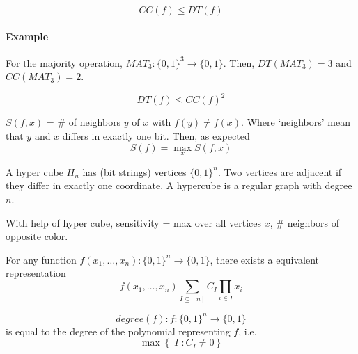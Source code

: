 \begin{proposition}
	\begin{equation}
		CC(f) \leq DT(f)
	\end{equation}
\end{proposition}

\paragraph{Example} For the majority operation, $MAT_3: \{ 0, 1\} ^3 \rightarrow \{ 0 , 1 \}$. Then, $DT(MAT_3) = 3$ and $CC(MAT_3) = 2$. 

\begin{proposition} 
	\begin{equation}
		DT(f) \leq CC(f) ^ 2
	\end{equation}	
\end{proposition}

\begin{definition}
	[Sensitivity] 
	$S(f, x)$ = \# of neighbors $y$ of $x$ with $f(y) \neq f(x)$. Where `neighbors' mean that $y$ and $x$ differs in exactly one bit. Then, as expected
	\begin{equation}
		S(f) = \max_x S(f, x)
	\end{equation}
\end{definition}

\begin{definition}
	A hyper cube $H_n$ has (bit strings) vertices $\{ 0, 1 \} ^ n$. Two vertices are adjacent if they differ in exactly one coordinate. A hypercube is a regular graph with degree $n$. 
\end{definition}

\begin{definition}
	With help of hyper cube, sensitivity = max over all vertices $x$, \# neighbors of opposite color. 
\end{definition}

\begin{proposition} 
	\label{prop: function as polynomial}
	For any function $f(x_1, \dots, x_n): \{ 0, 1\}^n \rightarrow \{0 , 1\}$, there exists a equivalent representation
	\begin{equation}
		f(x_1, \dots, x_n) \sum_{I \subseteq [n]} C_I \prod_{i \in I} x_i
	\end{equation}
\end{proposition}

\begin{definition}
	[Degree] 
	\begin{equation}
		degree(f): f: \{ 0, 1 \} ^ n \rightarrow \{ 0, 1\} 
	\end{equation}
	is equal to the degree of the polynomial representing $f$, i.e. 
	\begin{equation}
		\max\left\{ |I| : C_I \neq 0 \right\} 
	\end{equation}
\end{definition}

